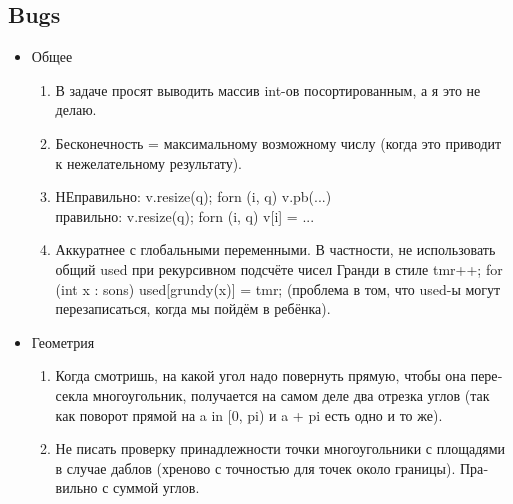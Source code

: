 \subsection{Bugs}
\begin{itemize}
    \item \foreignlanguage{russian}{Общее}
        \begin{enumerate}
            \item \foreignlanguage{russian}{В задаче просят выводить массив int-ов посортированным, а я это не делаю.}
            
            \item \foreignlanguage{russian}{Бесконечность = максимальному возможному числу
(когда это приводит к нежелательному результату).}

            \item \foreignlanguage{russian}{НЕправильно: v.resize(q); forn (i, q) v.pb(...)\\ правильно: v.resize(q); forn (i, q) v[i] = ...}

            \item \foreignlanguage{russian}{Аккуратнее с глобальными переменными. В частности, не использовать общий used
при рекурсивном подсчёте чисел Гранди в стиле
tmr++; for (int x : sons) used[grundy(x)] = tmr;
(проблема в том, что used-ы могут перезаписаться, когда мы пойдём в ребёнка).}

        \end{enumerate}

    \item \foreignlanguage{russian}{Геометрия} 
        \begin{enumerate}
            \item \foreignlanguage{russian}{Когда смотришь, на какой угол надо повернуть прямую, чтобы она пересекла
            многоугольник, получается на самом деле два отрезка углов (так как поворот прямой
                на a in [0, pi) и a + pi есть одно и то же).}
            \item \foreignlanguage{russian}{Не писать проверку принадлежности точки многоугольники
            с площадями в случае даблов (хреново с точностью для точек около
            границы). Правильно с суммой углов.}
        \end{enumerate}

\end{itemize}

